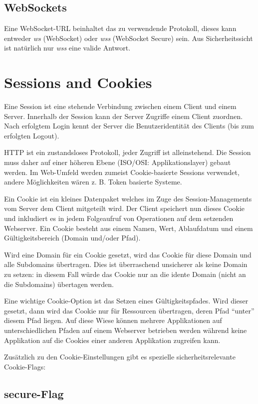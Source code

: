\subsection{WebSockets}

Eine WebSocket-URL beinhaltet das zu verwendende Protokoll, dieses kann entweder \textit{ws} (WebSocket) oder \textit{wss} (WebSocket Secure) sein. Aus Sicherheitssicht ist natürlich nur \textit{wss} eine valide Antwort.

\section{Sessions and Cookies}

Eine Session ist eine stehende Verbindung zwischen einem Client und einem Server. Innerhalb der Session kann der Server Zugriffe einem Client zuordnen. Nach erfolgtem Login kennt der Server die Benutzeridentität des Clients (bis zum erfolgten Logout).

HTTP ist ein zustandsloses Protokoll, jeder Zugriff ist alleinstehend. Die Session muss daher auf einer höheren Ebene (ISO/OSI: Applikationslayer) gebaut werden. Im Web-Umfeld werden zumeist Cookie-basierte Sessions verwendet, andere Möglichkeiten wären z. B. Token basierte Systeme.

Ein Cookie ist ein kleines Datenpaket welches im Zuge des Session-Managements vom Server dem Client mitgeteilt wird. Der Client speichert nun dieses Cookie und inkludiert es in jedem Folgeaufruf von Operationen auf dem setzenden Webserver. Ein Cookie besteht aus einem Namen, Wert, Ablaufdatum und einem Gültigkeitsbereich (Domain und/oder Pfad).

Wird eine Domain für ein Cookie gesetzt, wird das Cookie für diese Domain und alle Subdomains übertragen. Dies ist überraschend unsicherer als keine Domain zu setzen: in diesem Fall würde das Cookie nur an die idente Domain (nicht an die Subdomains) übertagen werden.

Eine wichtige Cookie-Option ist das Setzen eines Gültigkeitspfades. Wird dieser gesetzt, dann wird das Cookie nur für Ressourcen übertragen, deren Pfad ``unter'' diesem Pfad liegen. Auf diese Wiese können mehrere Applikationen auf unterschiedlichen Pfaden auf einem Webserver betrieben werden während keine Applikation auf die Cookies einer anderen Applikation zugreifen kann.

Zusätzlich zu den Cookie-Einstellungen gibt es spezielle sicherheitsrelevante Cookie-Flags:

\subsection{secure-Flag}


